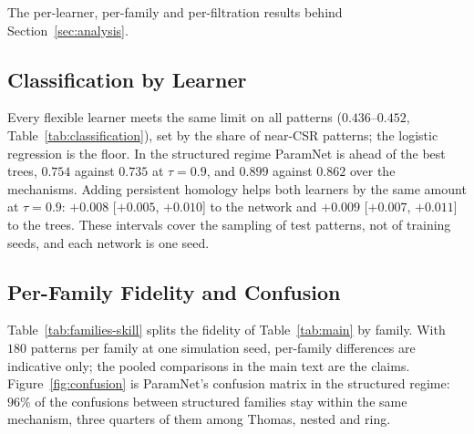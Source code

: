 The per-learner, per-family and per-filtration results behind Section~\ref{sec:analysis}.

\subsection{Classification by Learner}
\label{app:classification}

Every flexible learner meets the same limit on all patterns ($0.436$--$0.452$, Table~\ref{tab:classification}), set
by the share of near-CSR patterns; the logistic regression is the floor. In the structured regime ParamNet is ahead
of the best trees, $0.754$ against $0.735$ at $\tau=0.9$, and $0.899$ against $0.862$ over the mechanisms. Adding
persistent homology helps both learners by the same amount at $\tau=0.9$: $+0.008$ [$+0.005$, $+0.010$] to the
network and $+0.009$ [$+0.007$, $+0.011$] to the trees. These intervals cover the sampling of test patterns, not of
training seeds, and each network is one seed.

\begin{table}[h]
\caption{Balanced accuracy over the eight families on the $192\,000$ test patterns. ``All'' is every pattern;
``$\tau{=}0.5$'' and ``$\tau{=}0.9$'' restrict to the structured regime at that detection power
(Section~\ref{sec:analysis}); ``Coarse'' is accuracy over the four mechanisms (CSR, clustered, regular, cell) at
$\tau{=}0.9$. Learners are named by input: ``classical'' is the summary curves, ``PH'' the persistence summaries of
the alpha and DTM$_{10}$ diagrams. Minimum contrast is penalized-contrast selection, which never selects Strauss or
cell. Intervals are within $\pm0.003$; higher is better throughout. Every learner meets the same limit on all
patterns, and ParamNet is ahead in the structured regime.}
\label{tab:classification}
\begin{center}
\footnotesize

\end{center}
\end{table}

\subsection{Per-Family Fidelity and Confusion}
\label{app:families-skill}

Table~\ref{tab:families-skill} splits the fidelity of Table~\ref{tab:main} by family. With $180$ patterns per family
at one simulation seed, per-family differences are indicative only; the pooled comparisons in the main text are the
claims. Figure~\ref{fig:confusion} is ParamNet's confusion matrix in the structured regime: $96\%$ of the confusions
between structured families stay within the same mechanism, three quarters of them among Thomas, nested and ring.

